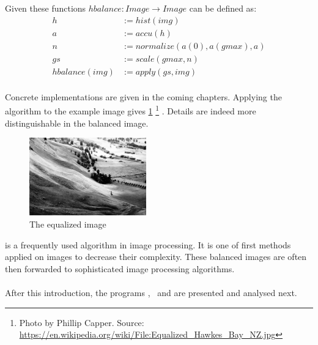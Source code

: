     Given these functions $hbalance: Image \rightarrow Image$ can be defined as:
    \begin{equation*}
    \begin{split}
        h & := hist(img) \\
        a & := accu(h) \\
        n & := normalize(a(0), a(gmax), a) \\
        gs & := scale(gmax,n) \\
      hbalance(img) & := apply(gs,img) \\
    \end{split}
    \end{equation*}
    
    Concrete implementations are given in the coming chapters.
    Applying the algorithm to the example image gives \ref{fig:img-eq}
    \footnote{Photo by Phillip Capper. Source: \url{https://en.wikipedia.org/wiki/File:Equalized_Hawkes_Bay_NZ.jpg}}
    . Details are indeed more distinguishable in the balanced image.
    
    \begin{figure}[h]
      \centering
      \includegraphics[width=0.45\textwidth]{img-eq}
      \caption{The equalized image}
      \label{fig:img-eq}
    \end{figure}
    
  \algo{} is a frequently used algorithm in image processing. It is 
  one of first methods applied on images to decrease their complexity.
  These balanced images are often then forwarded to sophisticated
  image processing algorithms.
  
  
  \paragraph{}
  After this introduction,
  the programs \seq, \man\, \ndpn and \ndpv are presented and analysed next.
  
    
